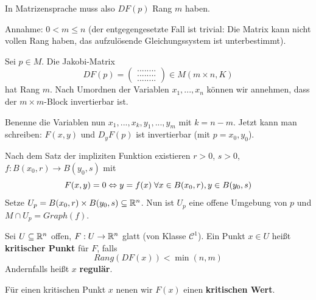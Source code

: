 \documentclass[main.tex]{subfiles}
\begin{document}
\begin{Bemerkung}
  In Matrizensprache muss also $DF(p)$ Rang $m$ haben.
\end{Bemerkung}

\begin{Beweis}
  Annahme: $0 < m \leq n$ (der entgegengesetzte Fall ist trivial: Die Matrix kann nicht vollen Rang haben, das aufzulösende Gleichungssystem ist unterbestimmt).

  Sei $p \in M$. Die Jakobi-Matrix
  $$DF(p) = \begin{pmatrix}
    ........\\........\\........
  \end{pmatrix} \in M(m \times n, K)$$
  hat Rang $m$. Nach Umordnen der Variablen $x_1, ..., x_n$ können wir annehmen, dass der $m \times m$-Block invertierbar ist.

  Benenne die Variablen nun $x_1,...,x_k, y_1,...,y_m$ mit $k = n - m$. Jetzt kann man schreiben: $F(x,y)$ und $D_y F(p)$ ist invertierbar (mit $p = x_0,y_0$).

  Nach dem Satz der impliziten Funktion existieren $r > 0$, $s > 0$, $f:B(x_0,r) \to B(y_0,s)$ mit
  $$F(x,y) = 0 \Leftrightarrow y = f(x) \;\forall x \in B(x_0,r), y \in B(y_0,s)$$
  Setze $U_p = B(x_0,r) \times B(y_0,s) \subseteq \mathbb{R}^n$. Nun ist $U_p$ eine offene Umgebung von $p$ und $M \cap U_p = Graph (f)$.
\end{Beweis}

\begin{Definition}
  Sei $U \subseteq \mathbb{R}^n$ offen, $F: U \to \mathbb{R}^n$ glatt (von Klasse $\mathcal{C}^1$). Ein Punkt $x \in U$ heißt \textbf{kritischer Punkt} für $F$, falls
  $$Rang(DF(x)) < \min(n,m)$$
  Andernfalls heißt $x$ \textbf{regulär}.

  Für einen kritischen Punkt $x$ nenen wir $F(x)$ einen \textbf{kritischen Wert}.
\end{Definition}
\end{document}
